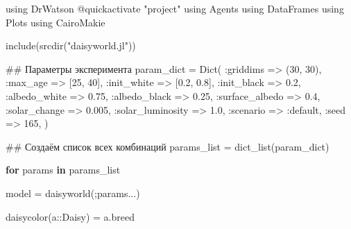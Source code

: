 \documentclass[
  english,
  russian,
  12pt,
  a4paper,
  DIV=11,
  numbers=noendperiod]{scrreprt}
\newenvironment{Shaded}{\begin{snugshade}}{\end{snugshade}}
\newcommand{\BuiltInTok}[1]{\textcolor[rgb]{0.00,0.23,0.31}{#1}}
\newcommand{\CommentTok}[1]{\textcolor[rgb]{0.37,0.37,0.37}{#1}}
\newcommand{\ControlFlowTok}[1]{\textcolor[rgb]{0.00,0.23,0.31}{\textbf{#1}}}
\newcommand{\DataTypeTok}[1]{\textcolor[rgb]{0.68,0.00,0.00}{#1}}
\newcommand{\FloatTok}[1]{\textcolor[rgb]{0.68,0.00,0.00}{#1}}
\newcommand{\FunctionTok}[1]{\textcolor[rgb]{0.28,0.35,0.67}{#1}}
\newcommand{\ImportTok}[1]{\textcolor[rgb]{0.00,0.46,0.62}{#1}}
\newcommand{\KeywordTok}[1]{\textcolor[rgb]{0.00,0.23,0.31}{\textbf{#1}}}
\newcommand{\NormalTok}[1]{\textcolor[rgb]{0.00,0.23,0.31}{#1}}
\newcommand{\OperatorTok}[1]{\textcolor[rgb]{0.37,0.37,0.37}{#1}}
\newcommand{\PreprocessorTok}[1]{\textcolor[rgb]{0.68,0.00,0.00}{#1}}
\newcommand{\StringTok}[1]{\textcolor[rgb]{0.13,0.47,0.30}{#1}}
\begin{document}
\begin{Shaded}
\begin{Highlighting}[]
\ImportTok{using} \BuiltInTok{DrWatson}
\PreprocessorTok{@quickactivate} \StringTok{"project"}
\ImportTok{using} \BuiltInTok{Agents}
\ImportTok{using} \BuiltInTok{DataFrames}
\ImportTok{using} \BuiltInTok{Plots}
\ImportTok{using} \BuiltInTok{CairoMakie}

\FunctionTok{include}\NormalTok{(}\FunctionTok{srcdir}\NormalTok{(}\StringTok{"daisyworld.jl"}\NormalTok{))}

\CommentTok{\#\# Параметры эксперимента}
\NormalTok{param\_dict }\OperatorTok{=} \FunctionTok{Dict}\NormalTok{(}
    \OperatorTok{:}\NormalTok{griddims }\OperatorTok{=\textgreater{}}\NormalTok{ (}\FloatTok{30}\NormalTok{, }\FloatTok{30}\NormalTok{),}
    \OperatorTok{:}\NormalTok{max\_age }\OperatorTok{=\textgreater{}}\NormalTok{ [}\FloatTok{25}\NormalTok{, }\FloatTok{40}\NormalTok{],}
    \OperatorTok{:}\NormalTok{init\_white }\OperatorTok{=\textgreater{}}\NormalTok{ [}\FloatTok{0.2}\NormalTok{, }\FloatTok{0.8}\NormalTok{],}
    \OperatorTok{:}\NormalTok{init\_black }\OperatorTok{=\textgreater{}} \FloatTok{0.2}\NormalTok{,}
    \OperatorTok{:}\NormalTok{albedo\_white }\OperatorTok{=\textgreater{}} \FloatTok{0.75}\NormalTok{,}
    \OperatorTok{:}\NormalTok{albedo\_black }\OperatorTok{=\textgreater{}} \FloatTok{0.25}\NormalTok{,}
    \OperatorTok{:}\NormalTok{surface\_albedo }\OperatorTok{=\textgreater{}} \FloatTok{0.4}\NormalTok{,}
    \OperatorTok{:}\NormalTok{solar\_change }\OperatorTok{=\textgreater{}} \FloatTok{0.005}\NormalTok{,}
    \OperatorTok{:}\NormalTok{solar\_luminosity }\OperatorTok{=\textgreater{}} \FloatTok{1.0}\NormalTok{,}
    \OperatorTok{:}\NormalTok{scenario }\OperatorTok{=\textgreater{}} \OperatorTok{:}\NormalTok{default,}
    \OperatorTok{:}\NormalTok{seed }\OperatorTok{=\textgreater{}} \FloatTok{165}\NormalTok{,}
\NormalTok{)}

\CommentTok{\#\# Создаём список всех комбинаций}
\NormalTok{params\_list }\OperatorTok{=} \FunctionTok{dict\_list}\NormalTok{(param\_dict)}

\ControlFlowTok{for}\NormalTok{ params }\KeywordTok{in}\NormalTok{ params\_list}

\NormalTok{    model }\OperatorTok{=} \FunctionTok{daisyworld}\NormalTok{(;params}\OperatorTok{...}\NormalTok{)}

    \FunctionTok{daisycolor}\NormalTok{(a}\OperatorTok{::}\DataTypeTok{Daisy}\NormalTok{) }\OperatorTok{=}\NormalTok{ a.breed}


\end{Highlighting}
\end{Shaded}
\end{document}
